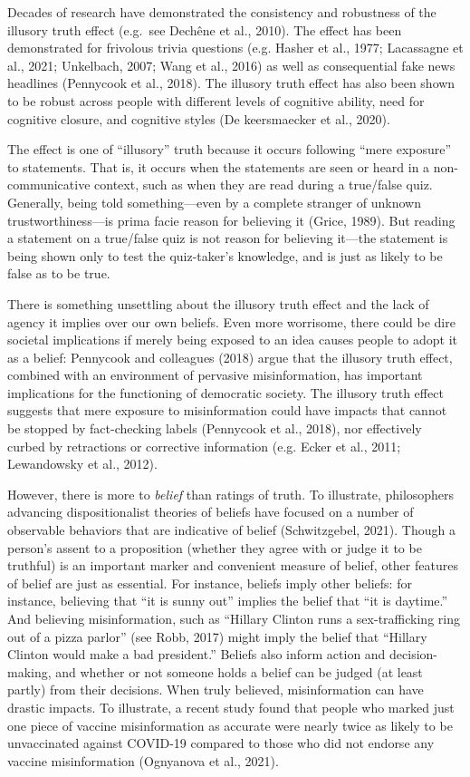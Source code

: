 \documentclass[10pt, letterpaper]{article}
\begin{document}
Decades of research have demonstrated the consistency and robustness of
the illusory truth effect (e.g.~see Dechêne et al., 2010). The effect
has been demonstrated for frivolous trivia questions (e.g. Hasher et
al., 1977; Lacassagne et al., 2021; Unkelbach, 2007; Wang et al., 2016)
as well as consequential fake news headlines (Pennycook et al., 2018).
The illusory truth effect has also been shown to be robust across people
with different levels of cognitive ability, need for cognitive closure,
and cognitive styles (De keersmaecker et al., 2020).

The effect is one of ``illusory'' truth because it occurs following
``mere exposure'' to statements. That is, it occurs when the statements
are seen or heard in a non-communicative context, such as when they are
read during a true/false quiz. Generally, being told something---even by
a complete stranger of unknown trustworthiness---is prima facie reason
for believing it (Grice, 1989). But reading a statement on a true/false
quiz is not reason for believing it---the statement is being shown only
to test the quiz-taker's knowledge, and is just as likely to be false as
to be true.

There is something unsettling about the illusory truth effect and the
lack of agency it implies over our own beliefs. Even more worrisome,
there could be dire societal implications if merely being exposed to an
idea causes people to adopt it as a belief: Pennycook and colleagues
(2018) argue that the illusory truth effect, combined with an
environment of pervasive misinformation, has important implications for
the functioning of democratic society. The illusory truth effect
suggests that mere exposure to misinformation could have impacts that
cannot be stopped by fact-checking labels (Pennycook et al., 2018), nor
effectively curbed by retractions or corrective information (e.g. Ecker
et al., 2011; Lewandowsky et al., 2012).

However, there is more to \emph{belief} than ratings of truth. To
illustrate, philosophers advancing dispositionalist theories of beliefs
have focused on a number of observable behaviors that are indicative of
belief (Schwitzgebel, 2021). Though a person's assent to a proposition
(whether they agree with or judge it to be truthful) is an important
marker and convenient measure of belief, other features of belief are
just as essential. For instance, beliefs imply other beliefs: for
instance, believing that ``it is sunny out'' implies the belief that
``it is daytime.'' And believing misinformation, such as ``Hillary
Clinton runs a sex-trafficking ring out of a pizza parlor'' (see Robb,
2017) might imply the belief that ``Hillary Clinton would make a bad
president.'' Beliefs also inform action and decision-making, and whether
or not someone holds a belief can be judged (at least partly) from their
decisions. When truly believed, misinformation can have drastic impacts.
To illustrate, a recent study found that people who marked just one
piece of vaccine misinformation as accurate were nearly twice as likely
to be unvaccinated against COVID-19 compared to those who did not
endorse any vaccine misinformation (Ognyanova et al., 2021).
\end{document}
